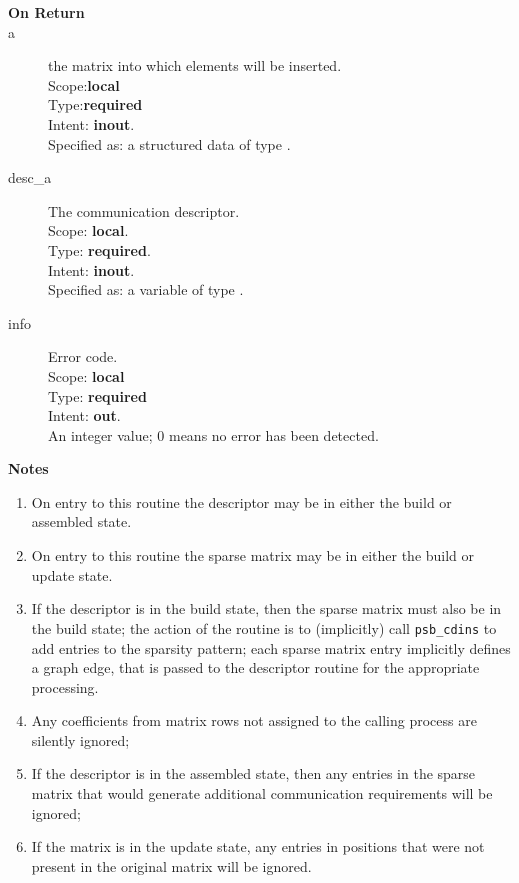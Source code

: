 \begin{description}
\item[\bf On Return]
\item[a] the matrix into which elements will be inserted.\\
Scope:{\bf local}\\
Type:{\bf required}\\
Intent: {\bf inout}.\\
Specified as: a structured data of type \spdata.
\item[desc\_a] The communication descriptor.\\
Scope: {\bf local}. \\
Type: {\bf required}.\\
Intent: {\bf inout}.\\
Specified as: a variable of type \descdata.\\
\item[info] Error code.\\
Scope: {\bf local} \\
Type: {\bf required} \\
Intent: {\bf out}.\\
An integer value; 0 means no error has been detected. 
\end{description}

{\par\noindent\large\bfseries Notes}
\begin{enumerate}
\item On entry to this routine the descriptor may be in either the
  build or assembled state.
\item On entry to this routine the sparse matrix may be in either the
  build or update state. 
\item If the descriptor is in the build state, then the sparse matrix
  must also be in the build state; the action of the routine is to
  (implicitly) call \verb|psb_cdins| to add entries to the sparsity
  pattern; each sparse matrix entry implicitly defines a graph edge,
  that is passed to the descriptor routine for the appropriate
  processing. 
\item Any coefficients from matrix rows not assigned to the calling
  process are silently ignored;
\item If the descriptor is in the assembled state, then any entries in
  the sparse matrix that would generate additional communication
  requirements will be ignored; 
\item If the matrix is in the update state, any entries in positions
  that were not present in the original matrix will be ignored. 
\end{enumerate}

